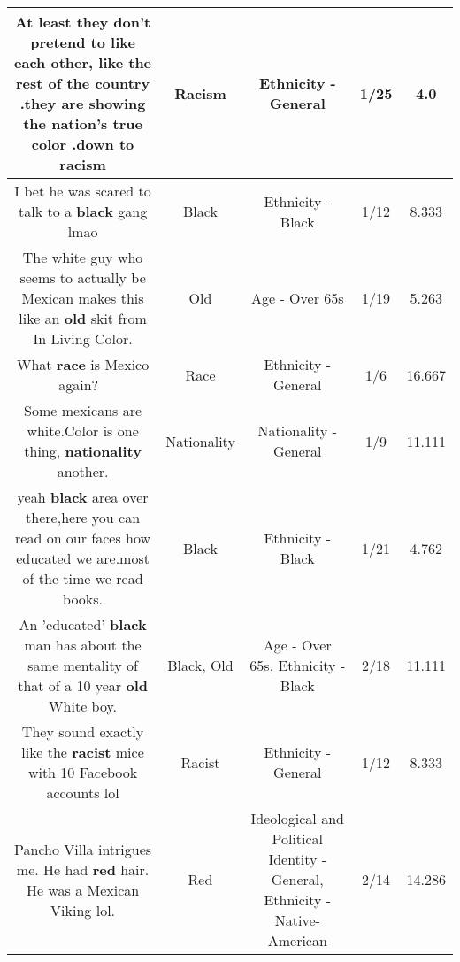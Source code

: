 \documentclass[11pt]{article}
\newlength\mylength
\begin{document}
\begin{center}
\begin{longtable}{|C{.65\mylength}|C{.30\mylength}|C{.12\mylength}|C{.12\mylength}|C{.12\mylength}|}
  \small At least they don't pretend to like each other, like the rest of the country .they are showing the nation's true color .down to racism\normalsize   & Racism & Ethnicity - General & 1/25 & 4.0 \\  \hline
  \small I bet he was scared to talk to a \textbf{black} gang lmao\normalsize   & Black & Ethnicity - Black & 1/12 & 8.333 \\  \hline
  \small The white guy who seems to actually be Mexican makes this like an \textbf{old} skit from In Living Color.\normalsize   & Old & Age - Over 65s & 1/19 & 5.263 \\  \hline
  \small What \textbf{race} is Mexico again? 🤣\normalsize   & Race & Ethnicity - General & 1/6 & 16.667 \\  \hline
  \small Some mexicans are white.Color is one thing, \textbf{nationality} another.\normalsize   & Nationality & Nationality - General & 1/9 & 11.111 \\  \hline
  \small yeah \textbf{black} area over there,here you can read on our faces how educated we are.most of the time we read books.\normalsize   & Black & Ethnicity - Black & 1/21 & 4.762 \\  \hline
  \small An 'educated' \textbf{black} man has about the same mentality of that of a 10 year \textbf{old} White boy.\normalsize   & Black, Old & Age - Over 65s, Ethnicity - Black & 2/18 & 11.111 \\  \hline
  \small They sound exactly like the \textbf{racist} mice with 10 Facebook accounts lol\normalsize   & Racist & Ethnicity - General & 1/12 & 8.333 \\  \hline
  \small Pancho Villa intrigues me. He had \textbf{r\textbf{ed}} hair. He was a Mexican Viking lol.\normalsize   & Red &  Ideological and Political Identity - General, Ethnicity - Native-American & 2/14 & 14.286 \\  \hline

\end{longtable}
\end{center}
\end{document}
